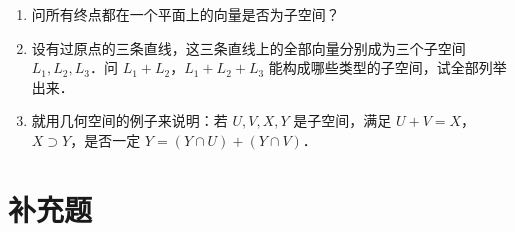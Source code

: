 \begin{enumerate}
  \begin{enumerate}
    \item 问所有终点都在一个平面上的向量是否为子空间？
  \anssub
    \item 设有过原点的三条直线，这三条直线上的全部向量分别成为三个子空间 $L_1,\allowbreak L_2,\allowbreak L_3$．问 $L_1+L_2$，$L_1+L_2+L_3$ 能构成哪些类型的子空间，试全部列举出来．
  \anssub
    \item 就用几何空间的例子来说明：若 $U,V,X,Y$ 是子空间，满足 $U+V=X$，$X\supset Y$，是否一定 $Y=(Y\cap U)+(Y\cap V)$．
  \anssub
  \end{enumerate}
\end{enumerate}

\section{补充题}

